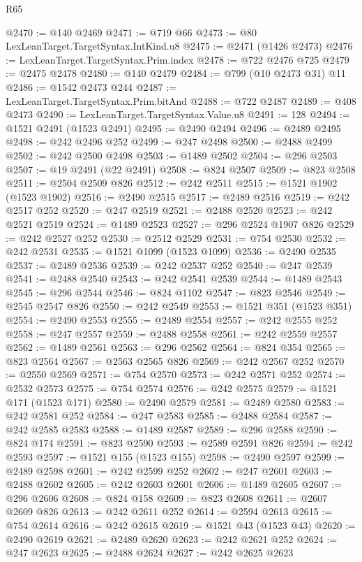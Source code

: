 \begin{lexlean}{R65}
\begin{coremodule}
{@2470 := @140 @2469
@2471 := @719 @66
@2473 := @80 LexLeanTarget.TargetSyntax.IntKind.u8
@2475 := @2471 (@1426 @2473)
@2476 := LexLeanTarget.TargetSyntax.Prim.index
@2478 := @722 @2476 @725
@2479 := @2475 @2478
@2480 := @140 @2479
@2484 := @799 (@10 @2473 @31) @11
@2486 := @1542 @2473 @244
@2487 := LexLeanTarget.TargetSyntax.Prim.bitAnd
@2488 := @722 @2487
@2489 := @408 @2473
@2490 := LexLeanTarget.TargetSyntax.Value.u8
@2491 := 128
@2494 := @1521 @2491 (@1523 @2491)
@2495 := @2490 @2494
@2496 := @2489 @2495
@2498 := @242 @2496 @252
@2499 := @247 @2498
@2500 := @2488 @2499
@2502 := @242 @2500 @2498
@2503 := @1489 @2502
@2504 := @296 @2503
@2507 := @19 @2491 (@22 @2491)
@2508 := @824 @2507
@2509 := @823 @2508
@2511 := @2504 @2509 @826
@2512 := @242 @2511
@2515 := @1521 @1902 (@1523 @1902)
@2516 := @2490 @2515
@2517 := @2489 @2516
@2519 := @242 @2517 @252
@2520 := @247 @2519
@2521 := @2488 @2520
@2523 := @242 @2521 @2519
@2524 := @1489 @2523
@2527 := @296 @2524 @1907 @826
@2529 := @242 @2527 @252
@2530 := @2512 @2529
@2531 := @754 @2530
@2532 := @242 @2531
@2535 := @1521 @1099 (@1523 @1099)
@2536 := @2490 @2535
@2537 := @2489 @2536
@2539 := @242 @2537 @252
@2540 := @247 @2539
@2541 := @2488 @2540
@2543 := @242 @2541 @2539
@2544 := @1489 @2543
@2545 := @296 @2544
@2546 := @824 @1102
@2547 := @823 @2546
@2549 := @2545 @2547 @826
@2550 := @242 @2549
@2553 := @1521 @351 (@1523 @351)
@2554 := @2490 @2553
@2555 := @2489 @2554
@2557 := @242 @2555 @252
@2558 := @247 @2557
@2559 := @2488 @2558
@2561 := @242 @2559 @2557
@2562 := @1489 @2561
@2563 := @296 @2562
@2564 := @824 @354
@2565 := @823 @2564
@2567 := @2563 @2565 @826
@2569 := @242 @2567 @252
@2570 := @2550 @2569
@2571 := @754 @2570
@2573 := @242 @2571 @252
@2574 := @2532 @2573
@2575 := @754 @2574
@2576 := @242 @2575
@2579 := @1521 @171 (@1523 @171)
@2580 := @2490 @2579
@2581 := @2489 @2580
@2583 := @242 @2581 @252
@2584 := @247 @2583
@2585 := @2488 @2584
@2587 := @242 @2585 @2583
@2588 := @1489 @2587
@2589 := @296 @2588
@2590 := @824 @174
@2591 := @823 @2590
@2593 := @2589 @2591 @826
@2594 := @242 @2593
@2597 := @1521 @155 (@1523 @155)
@2598 := @2490 @2597
@2599 := @2489 @2598
@2601 := @242 @2599 @252
@2602 := @247 @2601
@2603 := @2488 @2602
@2605 := @242 @2603 @2601
@2606 := @1489 @2605
@2607 := @296 @2606
@2608 := @824 @158
@2609 := @823 @2608
@2611 := @2607 @2609 @826
@2613 := @242 @2611 @252
@2614 := @2594 @2613
@2615 := @754 @2614
@2616 := @242 @2615
@2619 := @1521 @43 (@1523 @43)
@2620 := @2490 @2619
@2621 := @2489 @2620
@2623 := @242 @2621 @252
@2624 := @247 @2623
@2625 := @2488 @2624
@2627 := @242 @2625 @2623
}
\end{coremodule}
\end{lexlean}
